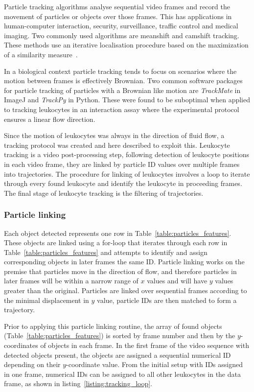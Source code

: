 Particle tracking algorithms analyse sequential video frames and record the movement of particles or objects over those frames. This has applications in human-computer interaction, security, surveillance, traffic control and medical imaging. Two commonly used algorithms are meanshift and camshift tracking. These methods use an iterative localisation procedure based on the maximization of a similarity measure~\cite{Comaniciu2000}.

In a biological context particle tracking tends to focus on scenarios where the motion between frames is effectively Brownian. Two common software packages for particle tracking of particles with a Brownian like motion are \emph{TrackMate} in ImageJ and \emph{TrackPy} in Python. These were found to be suboptimal when applied to tracking leukocytes in an interaction assay where the experimental protocol ensures a linear flow direction.

Since the motion of leukocytes was always in the direction of fluid flow, a tracking protocol was created and here described to exploit this. Leukocyte tracking is a video post-processing step, following detection of leukocyte positions in each video frame, they are linked by particle ID values over multiple frames into trajectories. The procedure for linking of leukocytes involves a loop to iterate through every found leukocyte and identify the leukocyte in proceeding frames. The final stage of leukocyte tracking is the filtering of trajectories.

\subsubsection{Particle linking}
Each object detected represents one row in Table~\ref{table:particles_features}. These objects are linked using a for-loop that iterates through each row in Table~\ref{table:particles_features} and attempts to identify and assign corresponding objects in later frames the same ID. Particle linking works on the premise that particles move in the direction of flow, and therefore particles in later frames will be within a narrow range of $x$ values and will have $y$ values greater than the original. Particles are linked over sequential frames according to the minimal displacement in $y$ value, particle IDs are then matched to form a trajectory.

Prior to applying this particle linking routine, the array of found objects (Table~\ref{table:particles_features}) is sorted by frame number and then by the $y$-coordinates of objects in each frame. In the first frame of the video sequence with detected objects present, the objects are assigned a sequential numerical ID depending on their $y$-coordinate value. From the initial setup with IDs assigned in one frame, numerical IDs can be assigned to all other leukocytes in the data frame, as shown in listing~\ref{listing:tracking_loop}. 

